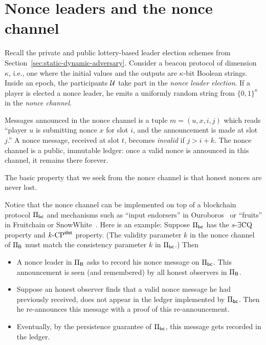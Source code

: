 
\section{Nonce leaders and the nonce channel}
Recall the private and public lottery-based leader election schemes 
from Section~\ref{sec:static-dynamic-adversary}. 
Consider a beacon protocol of dimension $\kappa$, 
i.e., one where the initial values and the outputs are $\kappa$-bit Boolean strings. 
Inside an epoch, 
the participants $\mathcal{U}$ take part in the \emph{nonce leader election}. 
If a player is elected a nonce leader, 
he emits a uniformly random string from $\{0,1\}^\kappa$  
in the \emph{nonce channel}. 

\begin{definition}\label{def:nonce-channel}
  Messages announced in the nonce channel is a tuple $m = (u, x, i, j)$ 
  which reads ``player $u$ is submitting nonce $x$ for slot $i$, 
  and the announcement is made at slot $j$.''
  A nonce message, received at slot $t$, becomes \emph{invalid} 
  if $j > i + k$.
  The nonce channel is a public, immutable ledger: 
  once a valid nonce is announced in this channel, 
  it remains there forever. 
\end{definition}
\noindent
The basic property that we seek from the nonce channel is that 
honest nonces are never lost. 


Notice that the nonce channel can be implemented 
on top of a blockchain protocol $\Pi_\mathsf{bc}$ 
and mechanisms such as ``input endorsers'' in Ouroboros~\cite{Ouroboros} 
or ``fruits'' in Fruitchain or SnowWhite~\cite{Fruitchains,SnowWhite}.
Here is an example: 
Suppose $\Pi_\mathsf{bc}$ has the ${s}\text{-}\exists\mathrm{CQ}$ property and ${k}\text{-}\mathrm{CP}^{\mathsf{slot}}$ property. 
(The validity parameter $k$ in the nonce channel of $\Pi_{\mathsf{B}}$ 
must match the consistency parameter $k$ in $\Pi_\mathsf{bc}$.)
Then
\begin{itemize}
  \item A nonce leader in $\Pi_{\mathsf{B}}$ asks to record his nonce message on $\Pi_\mathsf{bc}$.
  This announcement is seen (and remembered) by all honest observers in $\Pi_{\mathsf{B}}$.
  
  \item Suppose an honest observer finds that a valid nonce message he had previously received, 
  does not appear in the ledger implemented by $\Pi_\mathsf{bc}$. 
  Then he re-announces this message with a proof of this re-announcement.

  \item Eventually, by the persistence guarantee of $\Pi_\mathsf{bc}$, 
  this message gets recorded in the ledger.
\end{itemize}
\noindent




